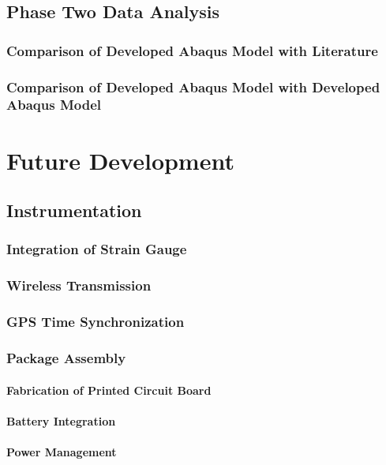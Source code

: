 \documentclass[12pt]{report}
\begin{document}
	\section{Phase Two Data Analysis}
		\subsection{Comparison of Developed Abaqus Model with Literature}
			
		\subsection{Comparison of Developed Abaqus Model with Developed Abaqus Model}	
		
\chapter{Future Development}
\label{ch:FutureDevelopment}
	\section{Instrumentation}
		\subsection{Integration of Strain Gauge}
			
		\subsection{Wireless Transmission}
			\label{sec:XBeeFuture}
		\subsection{GPS Time Synchronization}
			
		\subsection{Package Assembly}
			\subsubsection{Fabrication of Printed Circuit Board}
				
			\subsubsection{Battery Integration}
			\subsubsection{Power Management}
\end{document}
